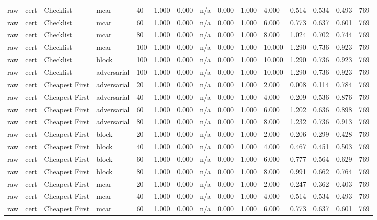 \begin{table}[!ht]
{\begin{tabular}{lllllllllllllll}
raw & cert & Checklist & mcar & 40 & 1.000 & 0.000 & n/a & 0.000 & 1.000 & 4.000 & 0.514 & 0.534 & 0.493 & 769 \\
raw & cert & Checklist & mcar & 60 & 1.000 & 0.000 & n/a & 0.000 & 1.000 & 6.000 & 0.773 & 0.637 & 0.601 & 769 \\
raw & cert & Checklist & mcar & 80 & 1.000 & 0.000 & n/a & 0.000 & 1.000 & 8.000 & 1.024 & 0.702 & 0.744 & 769 \\
raw & cert & Checklist & mcar & 100 & 1.000 & 0.000 & n/a & 0.000 & 1.000 & 10.000 & 1.290 & 0.736 & 0.923 & 769 \\
raw & cert & Checklist & block & 100 & 1.000 & 0.000 & n/a & 0.000 & 1.000 & 10.000 & 1.290 & 0.736 & 0.923 & 769 \\
raw & cert & Checklist & adversarial & 100 & 1.000 & 0.000 & n/a & 0.000 & 1.000 & 10.000 & 1.290 & 0.736 & 0.923 & 769 \\
raw & cert & Cheapest First & adversarial & 20 & 1.000 & 0.000 & n/a & 0.000 & 1.000 & 2.000 & 0.008 & 0.114 & 0.784 & 769 \\
raw & cert & Cheapest First & adversarial & 40 & 1.000 & 0.000 & n/a & 0.000 & 1.000 & 4.000 & 0.209 & 0.536 & 0.876 & 769 \\
raw & cert & Cheapest First & adversarial & 60 & 1.000 & 0.000 & n/a & 0.000 & 1.000 & 6.000 & 1.202 & 0.636 & 0.898 & 769 \\
raw & cert & Cheapest First & adversarial & 80 & 1.000 & 0.000 & n/a & 0.000 & 1.000 & 8.000 & 1.232 & 0.736 & 0.913 & 769 \\
raw & cert & Cheapest First & block & 20 & 1.000 & 0.000 & n/a & 0.000 & 1.000 & 2.000 & 0.206 & 0.299 & 0.428 & 769 \\
raw & cert & Cheapest First & block & 40 & 1.000 & 0.000 & n/a & 0.000 & 1.000 & 4.000 & 0.467 & 0.451 & 0.503 & 769 \\
raw & cert & Cheapest First & block & 60 & 1.000 & 0.000 & n/a & 0.000 & 1.000 & 6.000 & 0.777 & 0.564 & 0.629 & 769 \\
raw & cert & Cheapest First & block & 80 & 1.000 & 0.000 & n/a & 0.000 & 1.000 & 8.000 & 0.991 & 0.662 & 0.764 & 769 \\
raw & cert & Cheapest First & mcar & 20 & 1.000 & 0.000 & n/a & 0.000 & 1.000 & 2.000 & 0.247 & 0.362 & 0.403 & 769 \\
raw & cert & Cheapest First & mcar & 40 & 1.000 & 0.000 & n/a & 0.000 & 1.000 & 4.000 & 0.514 & 0.534 & 0.493 & 769 \\
raw & cert & Cheapest First & mcar & 60 & 1.000 & 0.000 & n/a & 0.000 & 1.000 & 6.000 & 0.773 & 0.637 & 0.601 & 769 \\

\end{tabular}}
\end{table}
